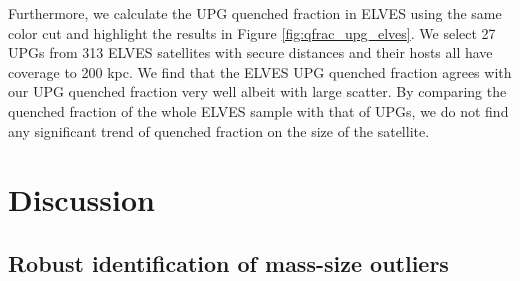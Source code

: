 \documentclass[twocolumn,astrosymb,twocolappendix]{aastex631}
\begin{document}
\begin{CJK*}{UTF8}{gbsn}
Furthermore, we calculate the UPG quenched fraction in ELVES using the same color cut and highlight the results in Figure \ref{fig:qfrac_upg_elves}. We select 27 UPGs from 313 ELVES satellites with secure distances and their hosts all have coverage to 200 kpc. We find that the ELVES UPG quenched fraction agrees with our UPG quenched fraction very well albeit with large scatter. By comparing the quenched fraction of the whole ELVES sample with that of UPGs, we do not find any significant trend of quenched fraction on the size of the satellite. 


\section{Discussion}\label{sec:discussion}

\subsection{Robust identification of mass-size outliers}\label{sec:artifact}



\end{CJK*}
\end{document}
